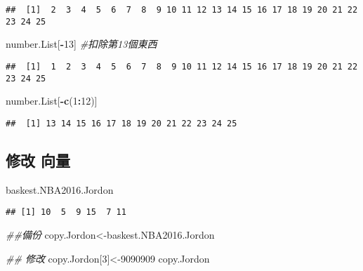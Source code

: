 \documentclass[]{article}
\newenvironment{Shaded}{\begin{snugshade}}{\end{snugshade}}
\newcommand{\CommentTok}[1]{\textcolor[rgb]{0.56,0.35,0.01}{\textit{#1}}}
\newcommand{\DecValTok}[1]{\textcolor[rgb]{0.00,0.00,0.81}{#1}}
\newcommand{\KeywordTok}[1]{\textcolor[rgb]{0.13,0.29,0.53}{\textbf{#1}}}
\newcommand{\NormalTok}[1]{#1}
\newcommand{\OperatorTok}[1]{\textcolor[rgb]{0.81,0.36,0.00}{\textbf{#1}}}
\begin{document}
\begin{verbatim}
##  [1]  2  3  4  5  6  7  8  9 10 11 12 13 14 15 16 17 18 19 20 21 22 23 24 25
\end{verbatim}

\begin{Shaded}
\begin{Highlighting}[]
\NormalTok{number.List[}\OperatorTok{-}\DecValTok{13}\NormalTok{] }\CommentTok{#扣除第13個東西}
\end{Highlighting}
\end{Shaded}

\begin{verbatim}
##  [1]  1  2  3  4  5  6  7  8  9 10 11 12 14 15 16 17 18 19 20 21 22 23 24 25
\end{verbatim}

\begin{Shaded}
\begin{Highlighting}[]
\NormalTok{number.List[}\OperatorTok{-}\KeywordTok{c}\NormalTok{(}\DecValTok{1}\OperatorTok{:}\DecValTok{12}\NormalTok{)]}
\end{Highlighting}
\end{Shaded}

\begin{verbatim}
##  [1] 13 14 15 16 17 18 19 20 21 22 23 24 25
\end{verbatim}

\hypertarget{ux4feeux6539-ux5411ux91cf}{%
\subsection{修改 向量}\label{ux4feeux6539-ux5411ux91cf}}

\begin{Shaded}
\begin{Highlighting}[]
\NormalTok{baskest.NBA2016.Jordon }
\end{Highlighting}
\end{Shaded}

\begin{verbatim}
## [1] 10  5  9 15  7 11
\end{verbatim}

\begin{Shaded}
\begin{Highlighting}[]
\CommentTok{##備份}
\NormalTok{copy.Jordon<-baskest.NBA2016.Jordon}

\CommentTok{## 修改}
\NormalTok{copy.Jordon[}\DecValTok{3}\NormalTok{]<-}\DecValTok{9090909}
\NormalTok{copy.Jordon}
\end{Highlighting}
\end{Shaded}
\end{document}
